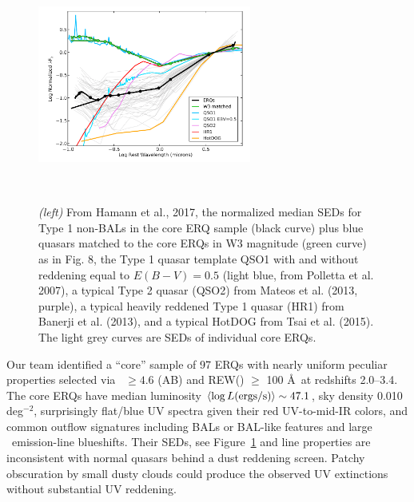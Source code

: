 \hspace{-2.5cm}
\begin{figure}[h]
  \begin{center}
    \hspace{-0.5cm}
    \includegraphics[height=7.0cm,width=7.0cm]{../Figures/Hamann2017_Fig16_SEDs.png}
    \vspace{-10pt}
    \caption{
      \footnotesize
      {\it (left)} From Hamann et al., 2017, the normalized median
      SEDs for Type 1 non-BALs in the core ERQ sample (black curve) plus
      blue quasars matched to the core ERQs in W3 magnitude (green curve) as
      in Fig. 8, the Type 1 quasar template QSO1 with and without reddening
      equal to $E(B − V) = 0.5$ (light blue, from Polletta et al. 2007), a
      typical Type 2 quasar (QSO2) from Mateos et al. (2013, purple), a
      typical heavily reddened Type 1 quasar (HR1) from Banerji et
      al. (2013), and a typical HotDOG from Tsai et al. (2015). The light
      grey curves are SEDs of individual core ERQs.
    }
    \vspace{-14pt}
    \label{fig:ERQ_SED}
  \end{center}
\end{figure}


\smallskip
\smallskip
\noindent
Our team identified a ``core'' sample of 97 ERQs with nearly uniform
peculiar properties selected via \imw\ $\ge 4.6$ (AB) and REW(\civ )
$\ge$ 100 \AA\ at redshifts 2.0--3.4.  The core ERQs have median
luminosity $\left<\log L ({\rm ergs/s})\right> \sim 47.1$, sky density
0.010 deg$^{-2}$, surprisingly flat/blue UV spectra given their red
UV-to-mid-IR colors, and common outflow signatures including BALs or
BAL-like features and large \civ\ emission-line blueshifts. Their
SEDs, see Figure~\ref{fig:ERQ_SED} and line properties are
inconsistent with normal quasars behind a dust reddening
screen. Patchy obscuration by small dusty clouds could produce the
observed UV extinctions without substantial UV reddening.


